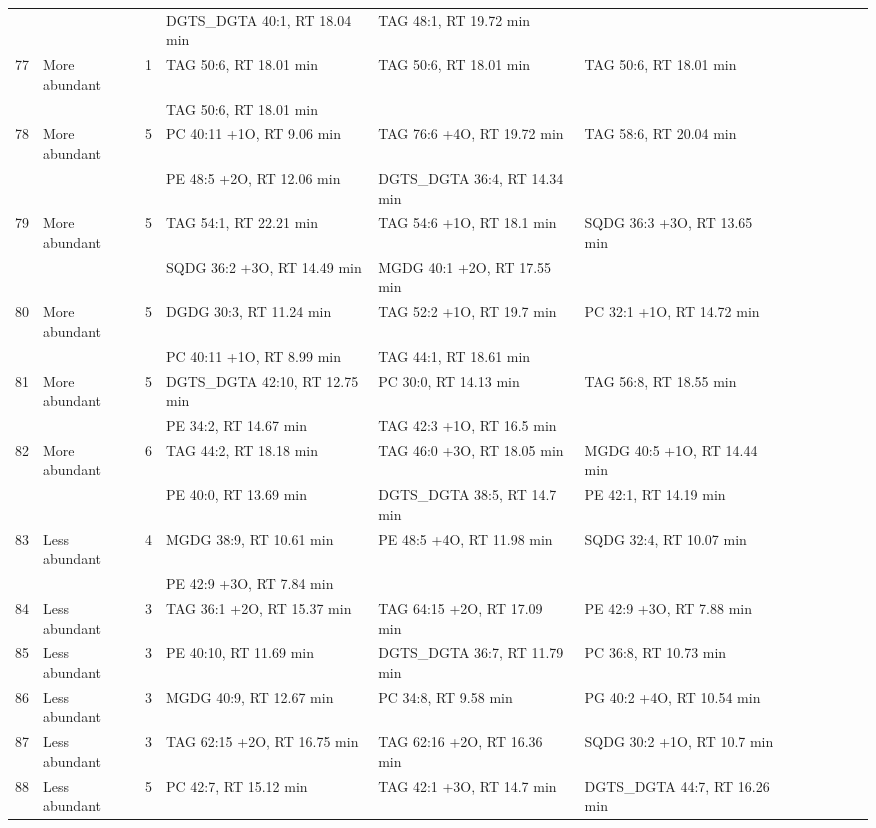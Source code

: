 \begin{landscape}
\begin{footnotesize}
\begin{singlespace}
\begin{flushleft}
\begin{longtable}{ Lp{.03\linewidth} Lp{.12\linewidth} Lp{.03\linewidth} Lp{.24\linewidth} Lp{.24\linewidth} Lp{.24\linewidth} }
 &  &  & DGTS\_DGTA 40:1, RT 18.04 min & TAG 48:1, RT 19.72 min &  \\
77 & More abundant & 1 & TAG 50:6, RT 18.01 min & TAG 50:6, RT 18.01 min & TAG 50:6, RT 18.01 min \\
 &  &  & TAG 50:6, RT 18.01 min &  &  \\
78 & More abundant & 5 & PC 40:11 +1O, RT 9.06 min & TAG 76:6 +4O, RT 19.72 min & TAG 58:6, RT 20.04 min \\
 &  &  & PE 48:5 +2O, RT 12.06 min & DGTS\_DGTA 36:4, RT 14.34 min &  \\
79 & More abundant & 5 & TAG 54:1, RT 22.21 min & TAG 54:6 +1O, RT 18.1 min & SQDG 36:3 +3O, RT 13.65 min \\
 &  &  & SQDG 36:2 +3O, RT 14.49 min & MGDG 40:1 +2O, RT 17.55 min &  \\
80 & More abundant & 5 & DGDG 30:3, RT 11.24 min & TAG 52:2 +1O, RT 19.7 min & PC 32:1 +1O, RT 14.72 min \\
 &  &  & PC 40:11 +1O, RT 8.99 min & TAG 44:1, RT 18.61 min &  \\
81 & More abundant & 5 & DGTS\_DGTA 42:10, RT 12.75 min & PC 30:0, RT 14.13 min & TAG 56:8, RT 18.55 min \\
 &  &  & PE 34:2, RT 14.67 min & TAG 42:3 +1O, RT 16.5 min &  \\
82 & More abundant & 6 & TAG 44:2, RT 18.18 min & TAG 46:0 +3O, RT 18.05 min & MGDG 40:5 +1O, RT 14.44 min \\
 &  &  & PE 40:0, RT 13.69 min & DGTS\_DGTA 38:5, RT 14.7 min & PE 42:1, RT 14.19 min \\
83 & Less abundant & 4 & MGDG 38:9, RT 10.61 min & PE 48:5 +4O, RT 11.98 min & SQDG 32:4, RT 10.07 min \\
 &  &  & PE 42:9 +3O, RT 7.84 min &  &  \\
84 & Less abundant & 3 & TAG 36:1 +2O, RT 15.37 min & TAG 64:15 +2O, RT 17.09 min & PE 42:9 +3O, RT 7.88 min \\
85 & Less abundant & 3 & PE 40:10, RT 11.69 min & DGTS\_DGTA 36:7, RT 11.79 min & PC 36:8, RT 10.73 min \\
86 & Less abundant & 3 & MGDG 40:9, RT 12.67 min & PC 34:8, RT 9.58 min & PG 40:2 +4O, RT 10.54 min \\
87 & Less abundant & 3 & TAG 62:15 +2O, RT 16.75 min & TAG 62:16 +2O, RT 16.36 min & SQDG 30:2 +1O, RT 10.7 min \\
88 & Less abundant & 5 & PC 42:7, RT 15.12 min & TAG 42:1 +3O, RT 14.7 min & DGTS\_DGTA 44:7, RT 16.26 min \\

\end{longtable}
\end{flushleft}
\end{singlespace}
\end{footnotesize}
\end{landscape}
